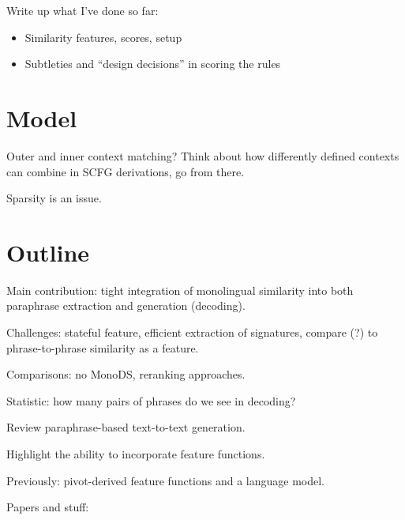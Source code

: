 \documentclass[11pt]{article}
\begin{document}
Write up what I've done so far:
\begin{itemize}
\item Similarity features, scores, setup
\item Subtleties and ``design decisions'' in scoring the rules
\end{itemize}

\section{Model}

Outer and inner context matching? Think about how differently defined
contexts can combine in SCFG derivations, go from there.

Sparsity is an issue.

\section{Outline}

Main contribution: tight integration of monolingual similarity into
both paraphrase extraction and generation (decoding).

Challenges: stateful feature, efficient extraction of signatures,
compare (?) to phrase-to-phrase similarity as a feature.

Comparisons: no MonoDS, reranking approaches.

Statistic: how many pairs of phrases do we see in decoding?

Review paraphrase-based text-to-text generation.

Highlight the ability to incorporate feature functions.

Previously: pivot-derived feature functions and a language model.

Papers and stuff:

\cite{langkilde1998practical}

\cite{langkilde1998generation}



\end{document}

